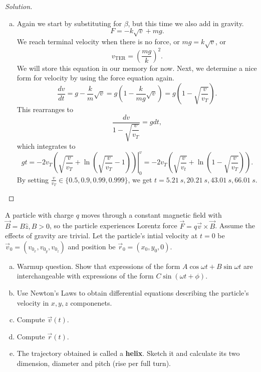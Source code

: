 \documentclass{article}
\begin{document}
\begin{proof}[Solution]
\begin{enumerate}[(a)]
\item
Again we start by substituting for $\beta$, but this time we also add in
gravity.
\[ F = -k\sqrt{v} + mg. \]
We reach terminal velocity when there is no force, or $mg = k \sqrt{v}$,
or
\[ v_{\textrm{TER}} = \left(\frac{mg}{k}\right)^2. \]
We will store this equation in our memory for now. Next, we determine a
nice form for velocity by using the force equation again.
\[ \frac{dv}{dt} = g - \frac{k}{m}\sqrt{v} = g \left(1 -
\frac{k}{mg}\sqrt{v}\right) = g\left(1 - \sqrt{\frac{v}{v_T}}\right). \]
This rearranges to
\[ \frac{dv}{1 - \sqrt{\dfrac{v}{v_T}}} = g dt, \]
which integrates to
\[ gt = \left. -2v_T \left(\sqrt{\frac{v}{v_T}} + \ln
\left(\sqrt{\frac{v}{v_T}} - 1\right)\right) \right \vert_0^v = -2v_T
\left(\sqrt{\frac{v}{v_t}} + \ln \left(1 - \sqrt{\frac{v}{v_T}}\right)
\right). \]
By setting $\frac{v}{v_T} \in \lbrace 0.5, 0.9, 0.99, 0.999 \rbrace$, we
get $\boxed{t = \SI{5.21}{s}, \SI{20.21}{s}, \SI{43.01}{s},
\SI{66.01}{s}}$.
\end{enumerate}
\end{proof}

\begin{prb}
A particle with charge $q$ moves through a constant magnetic field with
$\vec{B} = B \hat{z}, B > 0$, so the particle experiences Lorentz force
$\vec{F} = q\vec{v} \times \vec{B}$. Assume the effects of gravity are
trivial. Let the particle's intial velocity at $t = 0$ be $\vec{v}_0 =
(v_{0_x}, v_{0_y}, v_{0_z})$ and position be $\vec{r}_0 = (x_0, y_0,
0)$.

\begin{enumerate}[(a)]
\item
Warmup question. Show that expressions of the form $A \cos \omega
t + B \sin \omega t$ are interchangeable with expressions of the form $C
\sin(\omega t + \phi)$.
\item
Use Newton's Laws to obtain differential equations describing the
particle's velocity in $x, y, z$ componenets.
\item
Compute $\vec{v}(t)$.
\item
Compute $\vec{r}(t)$.
\item
The trajectory obtained is called a \textbf{helix}. Sketch it and
calculate its two dimension, diameter and pitch (rise per full turn).
\end{enumerate}
\end{prb}
\end{document}
